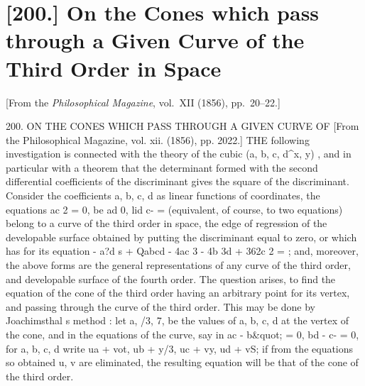 \documentclass[11pt,a4paper]{book}
\begin{document}
\newpage

\section*{[200.] On the Cones which pass through a Given Curve of the Third Order in Space}
\begin{center}
[From the \textit{Philosophical Magazine}, vol.~XII (1856), pp.~20--22.]
\end{center}


200.
ON THE CONES WHICH PASS THROUGH A GIVEN CURVE OF
[From the Philosophical Magazine,
vol.
xii.
(1856),
pp. 2022.]
THE following investigation
is connected with the theory of the cubic
(a,
b,
c, d^x, y)
,
and
in
particular
with
a
theorem
that
the
determinant
formed
with
the
second
differential
coefficients
of the
discriminant
gives
the square
of the
discriminant.
Consider the
coefficients
a,
b,
c, d
as
linear
functions
of coordinates,
the
equations
ac
2 = 0,
be
ad
0,
lid
c- =
(equivalent,
of
course,
to
two
equations) belong
to
a curve
of
the
third order in
space,
the
edge
of
regression
of
the
developable
surface
obtained by putting the
discriminant
equal
to
zero,
or which has
for
its equation
- a?d
s + Qabcd - 4ac
3 - 4b
3d + 362c
2 =
;
and,
moreover,
the
above
forms
are
the
general
representations
of
any
curve
of
the
third
order, and
developable
surface
of
the
fourth
order.
The
question
arises,
to
find
the
equation
of
the
cone
of
the
third
order
having
an
arbitrary point
for
its
vertex,
and
passing through the curve
of
the
third
order.
This may be done by Joachimsthal s
method
:
let
a,
/3,
7,
be
the
values
of
a,
b,
c, d
at
the
vertex
of
the
cone, and
in
the equations
of the
curve, say in
ac -
b\&quot; = 0,
bd - c- = 0,
for
a,
b,
c, d
write
ua + vot, ub + y/3, uc + vy, ud + vS;
if from the
equations
so obtained
u, v are
eliminated, the resulting equation
will be
that of the cone
of the third
order.

\end{document}
